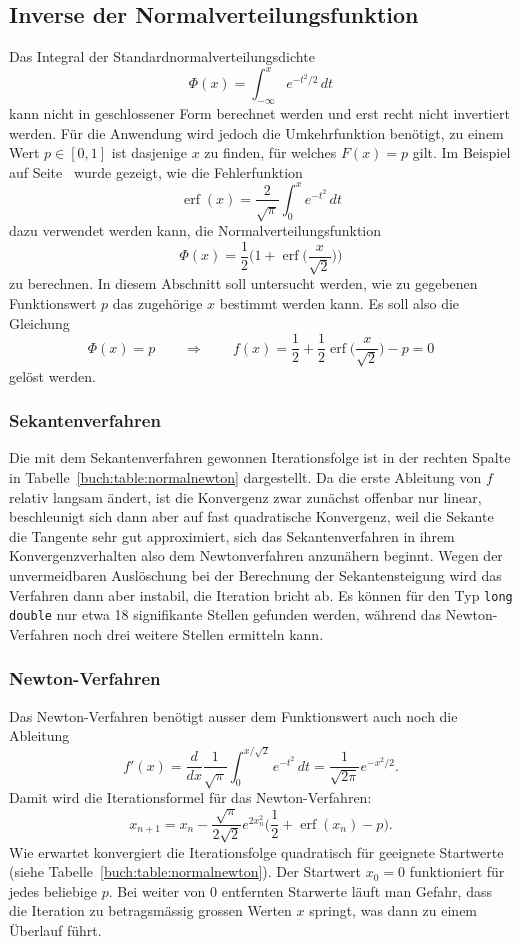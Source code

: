 %
%
%
\subsection{Inverse der Normalverteilungsfunktion
\label{buch:subsection:inversenormal}}
Das Integral der Standardnormalverteilungsdichte
\[
\Phi(x) = \int_{-\infty}^x e^{-t^2/2}\,dt
\]
kann nicht in geschlossener Form berechnet werden und erst recht
nicht invertiert werden.
Für die Anwendung wird jedoch die Umkehrfunktion benötigt, zu einem Wert
$p\in[0,1]$ ist dasjenige $x$ zu finden, für welches $F(x)=p$ gilt.
Im Beispiel auf Seite~\pageref{buch:beispiel:erfc} wurde gezeigt,
wie die Fehlerfunktion
\[
\operatorname{erf}(x) = \frac{2}{\sqrt{\pi}}\int_0^x e^{-t^2}\,dt
\]
dazu verwendet werden kann, die Normalverteilungsfunktion
\[
\Phi(x)
=
\frac12\biggl(1+\operatorname{erf}\biggl(\frac{x}{\sqrt{2}}\biggr)\biggr)
\]
zu berechnen.
In diesem Abschnitt soll untersucht werden, wie zu gegebenen Funktionswert
$p$ das zugehörige $x$ bestimmt werden kann.
Es soll also die Gleichung
\[
\Phi(x)=p
\qquad\Rightarrow\qquad
f(x)=\frac12+\frac12\operatorname{erf}\biggl(\frac{x}{\sqrt{2}}\biggr)-p=0
\]
gelöst werden.

\subsubsection{Sekantenverfahren}
Die mit dem Sekantenverfahren gewonnen Iterationsfolge ist in der rechten
Spalte in Tabelle~\ref{buch:table:normalnewton} dargestellt.
Da die erste Ableitung von $f$ relativ langsam ändert, ist die Konvergenz
zwar zunächst offenbar nur linear, beschleunigt sich dann aber auf fast
quadratische Konvergenz, weil die Sekante die Tangente sehr gut approximiert,
sich das Sekantenverfahren in ihrem Konvergenzverhalten also dem
Newtonverfahren anzunähern beginnt.
Wegen der unvermeidbaren Auslöschung bei der Berechnung der Sekantensteigung
wird das Verfahren dann aber instabil, die Iteration bricht ab.
Es können für den Typ \texttt{long double} nur etwa 18 signifikante
Stellen gefunden werden, während das Newton-Verfahren noch drei weitere
Stellen ermitteln kann.

\subsubsection{Newton-Verfahren}
Das Newton-Verfahren benötigt ausser dem Funktionswert auch noch die 
Ableitung
\[
f'(x)
=
\frac{d}{dx}\frac{1}{\sqrt{\pi}}\int_0^{x/\sqrt{2}} e^{-t^2}\,dt
=
\frac{1}{\sqrt{2\pi}}e^{-x^2/2}.
\]
Damit wird die Iterationsformel für das Newton-Verfahren:
\begin{equation}
x_{n+1} = x_n - \frac{\sqrt{\pi}}{2\sqrt{2}}e^{2x_n^2}
\biggl(\frac12+\operatorname{erf}(x_n) -p \biggr).
\end{equation}
Wie erwartet konvergiert die Iterationsfolge quadratisch für geeignete
Startwerte (siehe Tabelle~\ref{buch:table:normalnewton}).
Der Startwert $x_0=0$ funktioniert für jedes beliebige $p$.
Bei weiter von $0$ entfernten Starwerte läuft man Gefahr, dass die Iteration
zu betragsmässig grossen Werten $x$ springt, was dann zu einem Überlauf führt.


